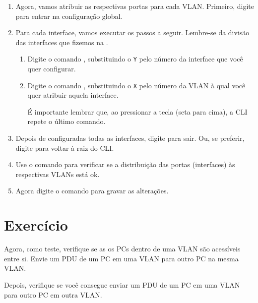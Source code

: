\begin{enumerate}[label*=\arabic*.]
    \item Agora, vamos atribuir as respectivas portas para cada VLAN. Primeiro, digite  para entrar na configuração global.

    \item Para cada interface, vamos executar os passos a seguir. Lembre-se da divisão das interfaces que fizemos na .

       \begin{enumerate}[label*=\arabic*.]
          \item Digite o comando , substituindo o \texttt{Y} pelo número da interface que você quer configurar.
          \item Digite o comando , substituindo o \texttt{X} pelo número da VLAN à qual você quer atribuir aquela interface. 
          
          É importante lembrar que, ao pressionar a tecla \keys{\arrowkey{^}} (seta para cima), a CLI repete o último comando.
       \end{enumerate}
    
    \item Depois de configuradas todas as interfaces, digite  para sair. Ou, se preferir, digite  para voltar à raiz do CLI.

    \item Use o comando  para verificar se a distribuição das portas (interfaces) às respectivas VLANs está ok.

    \item Agora digite o comando  para gravar as alterações. 
\end{enumerate}

\section{Exercício}
Agora, como teste, verifique se as os PCs dentro de uma VLAN são acessíveis entre si. Envie um PDU de um PC em uma VLAN para outro PC na mesma VLAN.

Depois, verifique se você consegue enviar um PDU de um PC em uma VLAN para outro PC em outra VLAN.